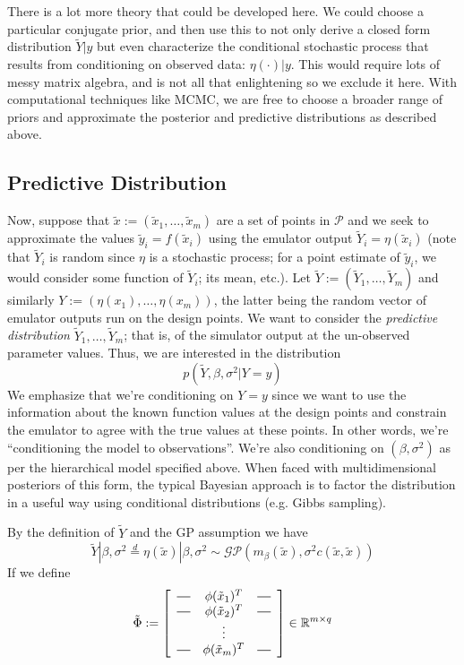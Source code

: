 \documentclass[12pt]{article}
\newcommand{\R}{\mathcal{R}}
\def\R{\mathbb{R}}
\newcommand*{\horzbar}{\rule[.5ex]{2.5ex}{0.5pt}} %
\begin{document}
There is a lot more theory that could be developed here. We could choose a particular conjugate prior, and then use this to not only derive a closed form distribution $\tilde{Y}|y$ but even 
characterize the conditional stochastic process that results from conditioning on observed data: $\eta(\cdot)|y$. This would require lots of messy matrix algebra, and is not all that enlightening 
so we exclude it here. With computational techniques like MCMC, we are free to choose a broader range of priors and approximate the posterior and predictive distributions as described above. 

\subsection{Predictive Distribution}

Now, suppose that $\tilde{x} := (\tilde{x}_1, \dots, \tilde{x}_m)$ are a set of points in $\mathcal{P}$ and we seek to approximate the values $\tilde{y}_i = f(\tilde{x}_i)$ using the 
emulator output $\tilde{Y}_i = \eta(\tilde{x}_i)$ (note that $\tilde{Y}_i$ is random since $\eta$ is a stochastic process; for a point estimate of $\tilde{y}_i$, we would consider some function of $\tilde{Y}_i$; 
its mean, etc.). Let $\tilde{Y} := (\tilde{Y}_1, \dots, \tilde{Y}_m)$ and similarly $Y := (\eta(x_1), \dots, \eta(x_m))$, the latter being the random vector of emulator outputs run on the design points. We want 
to consider the \textit{predictive distribution} $\tilde{Y}_1, \dots, \tilde{Y}_m$; that is, of the simulator output at the un-observed parameter values. Thus, we are interested 
in the distribution 
\[p(\tilde{Y}, \beta, \sigma^2|Y = y)\]
We emphasize that we're conditioning on $Y = y$ since we want to use the information about the known function values at the design points and constrain the emulator to agree with the true values 
at these points. In other words, we're ``conditioning the model to observations''. We're also conditioning on $(\beta, \sigma^2)$ as per the hierarchical model specified above. 
When faced with multidimensional posteriors of this form, the typical Bayesian approach is to factor the distribution in a 
useful way using conditional distributions (e.g. Gibbs sampling). 

By the definition of $\tilde{Y}$ and the GP assumption we have 
\[\tilde{Y}|\beta, \sigma^2 \overset{d}{=} \eta(\tilde{x})|\beta, \sigma^2 \sim \mathcal{GP}(m_\beta (\tilde{x}), \sigma^2 c(\tilde{x}, \tilde{x}))\]
If we define 
\[
\tilde{\Phi} := 
\left[
  \begin{array}{ccc}
    \horzbar & \phi(\tilde{x}_1)^T & \horzbar \\
    \horzbar & \phi(\tilde{x}_2)^T & \horzbar \\
             & \vdots    &          \\
    \horzbar & \phi(\tilde{x}_m)^T & \horzbar
  \end{array}
\right] \in \R^{m \times q}
\]
\end{document}

